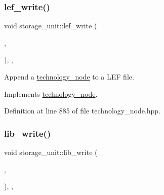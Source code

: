 \mbox{\label{structstorage__unit_a444c9109c8a40618702dba1fa86b05dc}} 
\subsubsection{\texorpdfstring{lef\+\_\+write()}{lef\_write()}}
{\footnotesize\ttfamily void storage\+\_\+unit\+::lef\+\_\+write (\begin{DoxyParamCaption}\item[{std\+::ofstream \&}]{,  }\item[{const \hyperlink{simple__indent_8hpp_ad85cff64e49d5dbf5cefe96f411c720e}{simple\+\_\+indent\+Ref}}]{ }\end{DoxyParamCaption})\hspace{0.3cm}{\ttfamily [inline]}, {\ttfamily [override]}, {\ttfamily [virtual]}}



Append a \hyperlink{structtechnology__node}{technology\+\_\+node} to a L\+EF file. 



Implements \hyperlink{structtechnology__node_a2a92a701dec7c32a6bee6f66576f1fc6}{technology\+\_\+node}.



Definition at line 885 of file technology\+\_\+node.\+hpp.

\mbox{\label{structstorage__unit_ad2c076de79995410b591bf3102c47cc1}} 
\subsubsection{\texorpdfstring{lib\+\_\+write()}{lib\_write()}}
{\footnotesize\ttfamily void storage\+\_\+unit\+::lib\+\_\+write (\begin{DoxyParamCaption}\item[{std\+::ofstream \&}]{,  }\item[{const \hyperlink{simple__indent_8hpp_ad85cff64e49d5dbf5cefe96f411c720e}{simple\+\_\+indent\+Ref}}]{ }\end{DoxyParamCaption})\hspace{0.3cm}{\ttfamily [inline]}, {\ttfamily [override]}, {\ttfamily [virtual]}}



